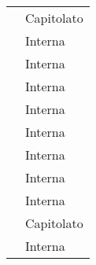 \begin{longtable}{C{6cm} C{6cm}}
     & Capitolato \\
    
     & Interna \\
    
     & Interna \\
    
     & Interna \\
    
     & Interna \\
    
     & Interna \\
    
     & Interna \\
    
     & Interna \\
    
     & Interna \\
    
     & Capitolato \\

	 & Interna \\
    
\end{longtable}
